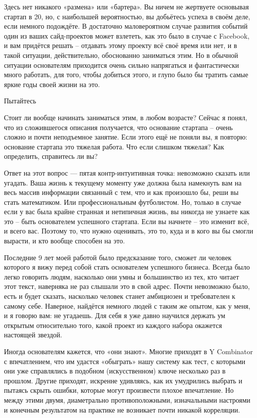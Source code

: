 \documentclass[ebook,12pt,oneside,openany]{memoir}
\begin{document}
Здесь нет никакого «размена» или «бартера». Вы ничем не жертвуете
основывая стартап в 20, но, с наибольшей вероятностью, вы добьётесь
успеха в своём деле, если немного подождёте. В достаточно
маловероятном случае развития событий один из ваших сайд-проектов
может взлететь, как это было в случае с Facebook, и вам придётся
решать – отдавать этому проекту всё своё время или нет, и в такой
ситуации, действительно, обоснованно заниматься этим. Но в обычной
ситуации основателям приходится очень сильно напрягаться и
фантастически много работать, для того, чтобы добиться этого, и глупо
было бы тратить самые яркие годы своей жизни на это.

Пытайтесь

Стоит ли вообще начинать заниматься этим, в любом возрасте? Сейчас я
понял, что из сложившегося описания получается, что основание стартапа
– очень сложно и почти неподъемное занятие. Если этого ещё не поняли
вы, я повторю: основание стартапа это тяжелая работа. Что если слишком
тяжелая? Как определить, справитесь ли вы?

Ответ на этот вопрос — пятая контр-интуитивная точка: невозможно
сказать или угадать. Ваша жизнь к текущему моменту уже должна была
намекнуть вам на весь массив информации связанный с тем, что и как
произошло бы, реши вы стать математиком. Или профессиональным
футболистом. Но, только в случае если у вас была крайне странная и
нетипичная жизнь, вы никогда не узнаете как это – быть основателем
успешного стартапа. Если вы начнете – это изменит всё, и всего вас.
Поэтому то, что нужно оценивать, это то, куда и в кого вы бы смогли
вырасти, и кто вообще способен на это.

Последние 9 лет моей работой было предсказание того, сможет ли человек
которого я вижу перед собой стать основателем успешного бизнеса.
Всегда было легко говорить людям, насколько они умны и большинство из
тех, кто читает этот текст, наверняка не раз слышали это в свой адрес.
Почти невозможно было, есть и будет сказать, насколько человек станет
амбициозен и требователен к самому себе. Наверное, найдётся немного
людей с таким же опытом, как у меня, и я говорю вам: не угадаешь. Для
себя я уже давно научился держать ум открытым относительно того, какой
проект из каждого набора окажется настоящей звездой.

Иногда основателям кажется, что «они знают». Многие приходят в Y
Combinator с впечатлением, что им удастся «обыграть» нашу систему как
тест, с которыми они уже справлялись в подобном (искусственном) ключе
несколько раз в прошлом. Другие приходят, искренне удивляясь, как их
умудрились выбрать и пытаясь скрыть ошибки, которые могут произвести
плохое впечатление. Но между этими двумя, диаметрально
противоположными, изначальными настроями и конечным результатом на
практике не возникает почти никакой корреляции.
\end{document}
